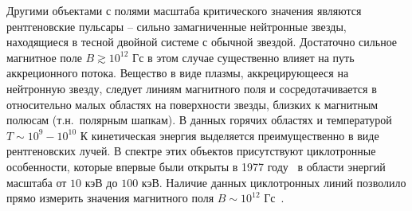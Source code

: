 Другими объектами с полями масштаба критического значения 
являются рентгеновские пульсары -- сильно замагниченные нейтронные звезды, 
находящиеся в тесной двойной системе с обычной звездой. Достаточно сильное 
магнитное поле $B\gtrsim10^{12}$ Гс в этом случае существенно влияет на путь 
аккреционного потока. Вещество в виде плазмы, аккрецирующееся на нейтронную 
звезду, следует линиям магнитного поля и сосредотачивается в относительно малых 
областях на поверхности звезды, близких к магнитным полюсам (т.н.~полярным 
шапкам). В данных горячих областях и температурой $T\sim10^9-10^{10}$ К кинетическая энергия 
выделяется преимущественно в виде рентгеновских лучей. В спектре этих объектов 
присутствуют циклотронные особенности, которые впервые были открыты в 1977 
году~\cite{Trumper:1977} в области энергий масштаба от $10$ кэВ до $100$ кэВ. Наличие данных циклотронных линий позволило прямо измерить 
значения магнитного поля $B\sim10^{12}$ Гс~\cite{Staubert:2019}.
 

